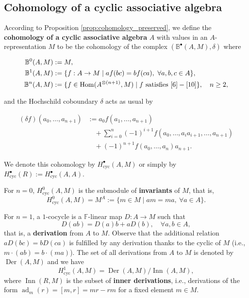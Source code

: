 \documentclass[pdflatex,sn-mathphys-num]{sn-jnl}%
\theoremstyle{thmstyleone}%
\theoremstyle{thmstyletwo}%
\theoremstyle{thmstylethree}%
\begin{document}
\subsection{Cohomology of a cyclic associative algebra}

According to Proposition \ref{prop:cohomology_preserved}, we define the \textbf{cohomology of a cyclic associative algebra} $A$ with values in an $A$-representation $M$ to be the cohomology of the complex $(\mathbb{B}^\bullet(A, M), \delta)$ where

\[
\begin{aligned}
\mathbb{B}^0(A, M) &:= M, \\
\mathbb{B}^1(A, M) &:= \{ f: A \to M \mid a f(bc) = b f(ca), \ \forall a, b, c \in A \}, \\
\mathbb{B}^n(A, M) &:= \{ f \in \operatorname{Hom}(A^{\otimes (n+1)}, M) \mid f \text{ satisfies } \ref{6}-\ref{10} \}, \quad n \ge 2,
\end{aligned}
\]

and the Hochschild coboundary $\delta$ acts as usual by

\[
\begin{aligned}
(\delta f)(a_0, \ldots, a_{n+1}) &:= a_0 f(a_1, \ldots, a_{n+1}) \\
&\quad + \sum_{i=0}^{n} (-1)^{i+1} f(a_0, \ldots, a_i a_{i+1}, \ldots, a_{n+1}) \\
&\quad + (-1)^{n+1} f(a_0, \ldots, a_n) a_{n+1}.
\end{aligned}
\]

We denote this cohomology by $H^\bullet_{\mathrm{cyc}}(A, M)$ or simply by $H^\bullet_{\mathrm{cyc}}(R) := H^\bullet_{\mathrm{cyc}}(A, A)$.

For $n = 0$, $H^0_{\mathrm{cyc}}(A, M)$ is the submodule of \textbf{invariants} of $M$, that is,
\[
H^0_{\mathrm{cyc}}(A, M) = M^A := \{ m \in M \mid a m = m a, \ \forall a \in A \}.
\]

For $n = 1$, a $1$-cocycle is a $\mathbb{F}$-linear map $D: A \to M$ such that
\[
D(ab) = D(a) b + a D(b), \quad \forall a, b \in A,
\]
that is, a \textbf{derivation} from $A$ to $M$. Observe that the additional relation $a D(bc) = b D(ca)$ is fulfilled by any derivation thanks to the cyclic of $M$ (i.e., $m \cdot (ab) = b \cdot (ma)$). The set of all derivations from $A$ to $M$ is denoted by $\operatorname{Der}(A, M)$ and we have
\[
H^1_{\mathrm{cyc}}(A, M) = \operatorname{Der}(A, M) / \operatorname{Inn}(A, M),
\]
where $\operatorname{Inn}(R, M)$ is the subset of \textbf{inner derivations}, i.e., derivations of the form $\operatorname{ad}_m(r) = [m, r] = m r - r m$ for a fixed element $m \in M$.
\end{document}
